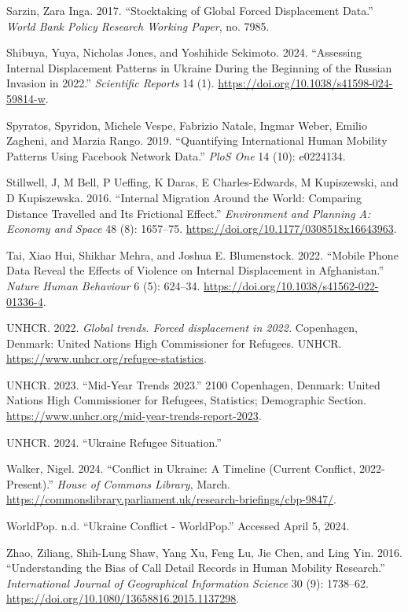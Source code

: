 \documentclass[
  sn-nature,
  11pt,
]{sn-jnl}
\newlength{\cslhangindent}
\newenvironment{CSLReferences}[2] %
 {\begin{list}{}{%
  \setlength{\itemindent}{0pt}
  \setlength{\leftmargin}{0pt}
  \setlength{\parsep}{0pt}
  \ifodd #1
   \setlength{\leftmargin}{\cslhangindent}
   \setlength{\itemindent}{-1\cslhangindent}
  \fi
  \setlength{\itemsep}{#2\baselineskip}}}
 {\end{list}}
\begin{document}
\begin{CSLReferences}{1}{0}
Sarzin, Zara Inga. 2017. {``Stocktaking of Global Forced Displacement
Data.''} \emph{World Bank Policy Research Working Paper}, no. 7985.

Shibuya, Yuya, Nicholas Jones, and Yoshihide Sekimoto. 2024.
{``Assessing Internal Displacement Patterns in Ukraine During the
Beginning of the Russian Invasion in 2022.''} \emph{Scientific Reports}
14 (1). \url{https://doi.org/10.1038/s41598-024-59814-w}.

Spyratos, Spyridon, Michele Vespe, Fabrizio Natale, Ingmar Weber, Emilio
Zagheni, and Marzia Rango. 2019. {``Quantifying International Human
Mobility Patterns Using Facebook Network Data.''} \emph{PloS One} 14
(10): e0224134.

Stillwell, J, M Bell, P Ueffing, K Daras, E Charles-Edwards, M
Kupiszewski, and D Kupiszewska. 2016. {``Internal Migration Around the
World: Comparing Distance Travelled and Its Frictional Effect.''}
\emph{Environment and Planning A: Economy and Space} 48 (8): 1657--75.
\url{https://doi.org/10.1177/0308518x16643963}.

Tai, Xiao Hui, Shikhar Mehra, and Joshua E. Blumenstock. 2022. {``Mobile
Phone Data Reveal the Effects of Violence on Internal Displacement in
Afghanistan.''} \emph{Nature Human Behaviour} 6 (5): 624--34.
\url{https://doi.org/10.1038/s41562-022-01336-4}.

UNHCR. 2022. \emph{Global trends. Forced displacement in 2022.}
Copenhagen, Denmark: {United Nations High Commissioner for Refugees.
UNHCR}. \url{https://www.unhcr.org/refugee-statistics}.

UNHCR. 2023. {``Mid-Year Trends 2023.''} 2100 Copenhagen, Denmark:
United Nations High Commissioner for Refugees, Statistics; Demographic
Section. \url{https://www.unhcr.org/mid-year-trends-report-2023}.

UNHCR. 2024. {``Ukraine Refugee Situation.''}

Walker, Nigel. 2024. {``Conflict in {Ukraine: A} Timeline (Current
Conflict, 2022-Present).''} \emph{{House of Commons Library}}, March.
\url{https://commonslibrary.parliament.uk/research-briefings/cbp-9847/}.

WorldPop. n.d. {``Ukraine Conflict - {WorldPop}.''} Accessed April 5,
2024.

Zhao, Ziliang, Shih-Lung Shaw, Yang Xu, Feng Lu, Jie Chen, and Ling Yin.
2016. {``Understanding the Bias of Call Detail Records in Human Mobility
Research.''} \emph{International Journal of Geographical Information
Science} 30 (9): 1738--62.
\url{https://doi.org/10.1080/13658816.2015.1137298}.

\end{CSLReferences}
\end{document}
